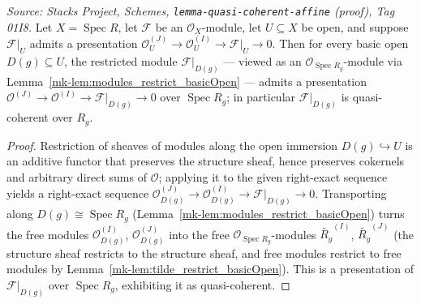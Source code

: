 \begin{lemma}
  \label{mk-lem:presentation_restrict_basicOpen}

  \textit{Source: Stacks Project, Schemes, \texttt{lemma-quasi-coherent-affine} (proof),
  Tag 01I8.}
  Let \(X = \operatorname{Spec} R\), let \(\mathcal{F}\) be an \(\mathcal{O}_X\)-module, let
  \(U \subseteq X\) be open, and suppose \(\mathcal{F}|_U\) admits a presentation
  \(\mathcal{O}_U^{(J)} \to \mathcal{O}_U^{(I)} \to \mathcal{F}|_U \to 0\). Then for every
  basic open \(D(g) \subseteq U\), the restricted module
  \(\mathcal{F}|_{D(g)}\) — viewed as an \(\mathcal{O}_{\operatorname{Spec} R_g}\)-module via
  Lemma~\ref{mk-lem:modules_restrict_basicOpen} — admits a presentation
  \(\mathcal{O}^{(J)} \to \mathcal{O}^{(I)} \to \mathcal{F}|_{D(g)} \to 0\) over
  \(\operatorname{Spec} R_g\); in particular \(\mathcal{F}|_{D(g)}\) is quasi-coherent over
  \(R_g\).
\end{lemma}
\begin{proof}
  Restriction of sheaves of modules along the open immersion
  \(D(g) \hookrightarrow U\) is an additive functor that preserves the structure sheaf, hence
  preserves cokernels and arbitrary direct sums of \(\mathcal{O}\); applying it to the given
  right-exact sequence yields a right-exact sequence
  \(\mathcal{O}_{D(g)}^{(J)} \to \mathcal{O}_{D(g)}^{(I)} \to \mathcal{F}|_{D(g)} \to 0\).
  Transporting along \(D(g) \cong \operatorname{Spec} R_g\)
  (Lemma~\ref{mk-lem:modules_restrict_basicOpen}) turns the free modules
  \(\mathcal{O}_{D(g)}^{(I)}\), \(\mathcal{O}_{D(g)}^{(J)}\) into the free
  \(\mathcal{O}_{\operatorname{Spec} R_g}\)-modules \(\widetilde{R_g}^{(I)}\),
  \(\widetilde{R_g}^{(J)}\) (the structure sheaf restricts to the structure sheaf, and free
  modules restrict to free modules by Lemma~\ref{mk-lem:tilde_restrict_basicOpen}). This is a
  presentation of \(\mathcal{F}|_{D(g)}\) over \(\operatorname{Spec} R_g\), exhibiting it as
  quasi-coherent.
\end{proof}

